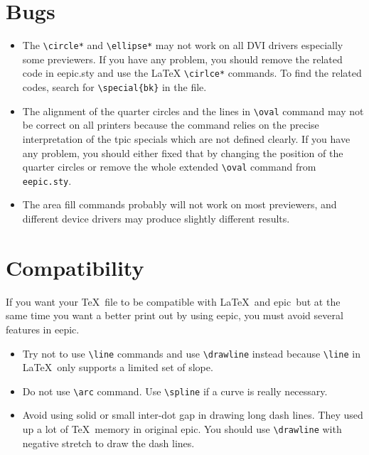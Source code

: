 \documentclass[11pt]{article}
\newcommand{\epic}{{\sc epic}}
\newcommand{\eepic}{{\sc eepic}}
\begin{document}
\clearpage


\section{Bugs}
\begin{itemize}
\item The \verb|\circle*| and \verb|\ellipse*| may not work on
all DVI drivers especially some previewers. If you have any
problem, you should remove the related code in eepic.sty and use
the \LaTeX{} \verb|\cirlce*| commands. To find the related codes,
search for \verb|\special{bk}| in the file.
\item The alignment of the quarter circles and the lines in
\verb|\oval| command may not be correct on all printers because
the command relies on the precise interpretation of the tpic
specials which are not defined clearly. If you have any problem,
you should either fixed that by changing the position of the
quarter circles or remove the whole extended \verb|\oval| command
from \verb|eepic.sty|.
\item The area fill commands probably will not work on most
previewers, and different device drivers may produce slightly
different results.
\end{itemize}


\section{Compatibility}\label{compat}
If you want your \TeX\ file to be compatible with \LaTeX\ and
\epic\ but at the same time you want a better print out by using
\eepic, you must avoid several features in \eepic.
\begin{itemize}
\item Try not to use \verb|\line| commands and use
\verb|\drawline| instead because \verb|\line| in \LaTeX\ only
supports a limited set of slope.
\item Do not use \verb|\arc| command. Use \verb|\spline| if a
curve is really necessary.
\item Avoid using solid or small inter-dot gap in drawing long
dash lines. They used up a lot of \TeX\ memory in original \epic.
You should use \verb|\drawline| with negative stretch to draw the
dash lines.
\end{itemize}
\end{document}
